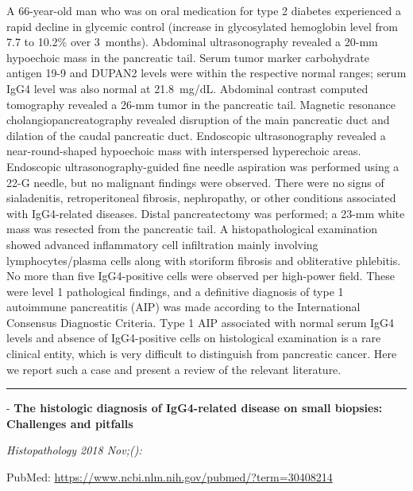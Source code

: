 \documentclass[]{article}
\begin{document}
A 66-year-old man who was on oral medication for type 2 diabetes
experienced a rapid decline in glycemic control (increase in
glycosylated hemoglobin level from 7.7 to 10.2\% over 3~months).
Abdominal ultrasonography revealed a 20-mm hypoechoic mass in the
pancreatic tail. Serum tumor marker carbohydrate antigen 19-9 and DUPAN2
levels were within the respective normal ranges; serum IgG4 level was
also normal at 21.8~mg/dL. Abdominal contrast computed tomography
revealed a 26-mm tumor in the pancreatic tail. Magnetic resonance
cholangiopancreatography revealed disruption of the main pancreatic duct
and dilation of the caudal pancreatic duct. Endoscopic ultrasonography
revealed a near-round-shaped hypoechoic mass with interspersed
hyperechoic areas. Endoscopic ultrasonography-guided fine needle
aspiration was performed using a 22-G needle, but no malignant findings
were observed. There were no signs of sialadenitis, retroperitoneal
fibrosis, nephropathy, or other conditions associated with IgG4-related
diseases. Distal pancreatectomy was performed; a 23-mm white mass was
resected from the pancreatic tail. A histopathological examination
showed advanced inflammatory cell infiltration mainly involving
lymphocytes/plasma cells along with storiform fibrosis and obliterative
phlebitis. No more than five IgG4-positive cells were observed per
high-power field. These were level 1 pathological findings, and a
definitive diagnosis of type 1 autoimmune pancreatitis (AIP) was made
according to the International Consensus Diagnostic Criteria. Type 1 AIP
associated with normal serum IgG4 levels and absence of IgG4-positive
cells on histological examination is a rare clinical entity, which is
very difficult to distinguish from pancreatic cancer. Here we report
such a case and present a review of the relevant literature.

{}

{}

\begin{center}\rule{0.5\linewidth}{\linethickness}\end{center}

 - \textbf{The histologic diagnosis of IgG4-related disease on small
biopsies: Challenges and pitfalls}

\emph{Histopathology 2018 Nov;():}

PubMed: \url{https://www.ncbi.nlm.nih.gov/pubmed/?term=30408214}
\end{document}
